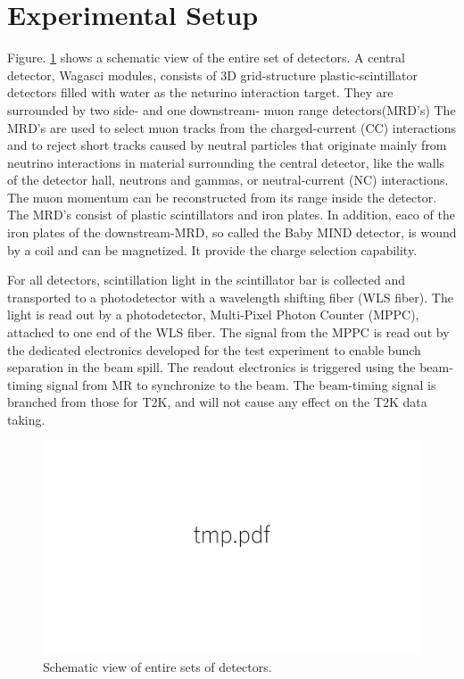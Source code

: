 \section{Experimental Setup}
Figure. \ref{fig:all_detector} shows a schematic view of the entire set of detectors.
A central detector, Wagasci modules, consists of 3D grid-structure plastic-scintillator detectors filled with water as the neturino interaction target.
They are surrounded by two side- and one downstream- muon range detectors(MRD's)
The MRD's are used to select muon tracks from the charged-current (CC) interactions 
and to reject short tracks caused by neutral particles 
that originate mainly from neutrino interactions in material surrounding the central detector, like the walls of the detector hall,
neutrons and gammas, or neutral-current (NC) interactions.
The muon momentum can be reconstructed from its range inside the detector.
The MRD's consist of plastic scintillators and iron plates.
In addition, eaco of the iron plates of the downstream-MRD, so called the Baby MIND detector, is wound by a coil and
can be magnetized. It provide the charge selection capability.

For all detectors, scintillation light in the scintillator bar is collected and transported to a photodetector with a wavelength shifting fiber (WLS fiber).
The light is read out by a photodetector, Multi-Pixel Photon Counter (MPPC), attached to one end of the WLS fiber.
The signal from the MPPC is read out by the dedicated electronics developed for the test experiment
to enable bunch separation in the beam spill.
The readout electronics is triggered using the beam-timing signal from MR to synchronize to the beam.
The beam-timing signal is branched from those for T2K, and will not cause any effect on the T2K data taking.

\begin{figure}[tbh]
\begin{center}
\includegraphics[width=0.8\linewidth]{fig/tmp.pdf}
\end{center}
\caption{
Schematic view of entire sets of detectors.
}
\label{fig:all_detector}
\end{figure}

